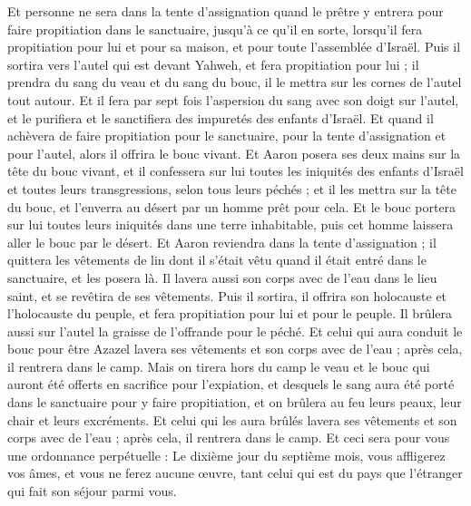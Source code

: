 \begin{multicols}{2}
Et personne ne sera dans la tente d'assignation quand le prêtre y entrera pour faire propitiation dans le sanctuaire, jusqu'à ce qu'il en sorte, lorsqu'il fera propitiation pour lui et pour sa maison, et pour toute l'assemblée d'Israël.
Puis il sortira vers l'autel qui est devant Yahweh, et fera propitiation pour lui ; il prendra du sang du veau et du sang du bouc, il le mettra sur les cornes de l'autel tout autour.
Et il fera par sept fois l'aspersion du sang avec son doigt sur l'autel, et le purifiera et le sanctifiera des impuretés des enfants d'Israël.
Et quand il achèvera de faire propitiation pour le sanctuaire, pour la tente d'assignation et pour l'autel, alors il offrira le bouc vivant.
Et Aaron posera ses deux mains sur la tête du bouc vivant, et il confessera sur lui toutes les iniquités des enfants d'Israël et toutes leurs transgressions, selon tous leurs péchés ; et il les mettra sur la tête du bouc, et l'enverra au désert par un homme prêt pour cela.
Et le bouc portera sur lui toutes leurs iniquités dans une terre inhabitable, puis cet homme laissera aller le bouc par le désert.
Et Aaron reviendra dans la tente d'assignation ; il quittera les vêtements de lin dont il s'était vêtu quand il était entré dans le sanctuaire, et les posera là.
Il lavera aussi son corps avec de l'eau dans le lieu saint, et se revêtira de ses vêtements. Puis il sortira, il offrira son holocauste et l'holocauste du peuple, et fera propitiation pour lui et pour le peuple.
Il brûlera aussi sur l'autel la graisse de l'offrande pour le péché.
Et celui qui aura conduit le bouc pour être Azazel lavera ses vêtements et son corps avec de l'eau ; après cela, il rentrera dans le camp.
Mais on tirera hors du camp le veau et le bouc qui auront été offerts en sacrifice pour l'expiation, et desquels le sang aura été porté dans le sanctuaire pour y faire propitiation, et on brûlera au feu leurs peaux, leur chair et leurs excréments.
Et celui qui les aura brûlés lavera ses vêtements et son corps avec de l'eau ; après cela, il rentrera dans le camp.
Et ceci sera pour vous une ordonnance perpétuelle : Le dixième jour du septième mois, vous affligerez vos âmes, et vous ne ferez aucune œuvre, tant celui qui est du pays que l'étranger qui fait son séjour parmi vous.

\end{multicols}
